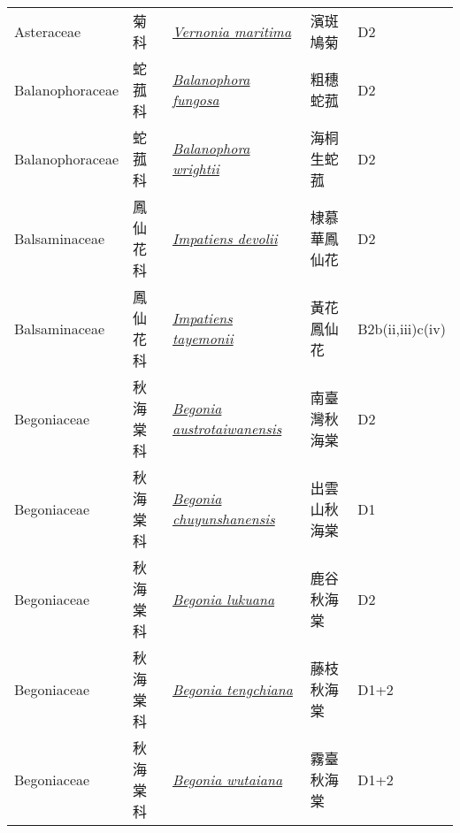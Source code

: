 {\begin{longtable}{p{2.5cm}p{2.5cm}p{4.5cm}p{2.5cm}p{3cm}}
    Asteraceae & 菊科 & \href{http://www.theplantlist.org/tpl1.1/search?q=Vernonia+maritima}{\textit{Vernonia maritima} } & 濱斑鳩菊 & D2 \index{Vernonia@\textit{Vernonia}!maritima@\textit{maritima}}  \index{濱斑鳩菊} \\
    Balanophoraceae & 蛇菰科 & \href{http://www.theplantlist.org/tpl1.1/search?q=Balanophora+fungosa}{\textit{Balanophora fungosa} } & 粗穗蛇菰 & D2 \index{Balanophora@\textit{Balanophora}!fungosa@\textit{fungosa}}  \index{粗穗蛇菰} \\
    Balanophoraceae & 蛇菰科 & \href{http://www.theplantlist.org/tpl1.1/search?q=Balanophora+wrightii}{\textit{Balanophora wrightii} } & 海桐生蛇菰 & D2 \index{Balanophora@\textit{Balanophora}!wrightii@\textit{wrightii}}  \index{海桐生蛇菰} \\
    Balsaminaceae & 鳳仙花科 & \href{http://www.theplantlist.org/tpl1.1/search?q=Impatiens+devolii}{\textit{Impatiens devolii} } & 棣慕華鳳仙花 & D2 \index{Impatiens@\textit{Impatiens}!devolii@\textit{devolii}}  \index{棣慕華鳳仙花} \\
    Balsaminaceae & 鳳仙花科 & \href{http://www.theplantlist.org/tpl1.1/search?q=Impatiens+tayemonii}{\textit{Impatiens tayemonii} } & 黃花鳳仙花 & B2b(ii,iii)c(iv) \index{Impatiens@\textit{Impatiens}!tayemonii@\textit{tayemonii}}  \index{黃花鳳仙花} \\
    Begoniaceae & 秋海棠科 & \href{http://www.theplantlist.org/tpl1.1/search?q=Begonia+austrotaiwanensis}{\textit{Begonia austrotaiwanensis} } & 南臺灣秋海棠 & D2 \index{Begonia@\textit{Begonia}!austrotaiwanensis@\textit{austrotaiwanensis}}  \index{南臺灣秋海棠} \\
    Begoniaceae & 秋海棠科 & \href{http://www.theplantlist.org/tpl1.1/search?q=Begonia+chuyunshanensis}{\textit{Begonia chuyunshanensis} } & 出雲山秋海棠 & D1 \index{Begonia@\textit{Begonia}!chuyunshanensis@\textit{chuyunshanensis}}  \index{出雲山秋海棠} \\
    Begoniaceae & 秋海棠科 & \href{http://www.theplantlist.org/tpl1.1/search?q=Begonia+lukuana}{\textit{Begonia lukuana} } & 鹿谷秋海棠 & D2 \index{Begonia@\textit{Begonia}!lukuana@\textit{lukuana}}  \index{鹿谷秋海棠} \\
    Begoniaceae & 秋海棠科 & \href{http://www.theplantlist.org/tpl1.1/search?q=Begonia+tengchiana}{\textit{Begonia tengchiana} } & 藤枝秋海棠 & D1+2 \index{Begonia@\textit{Begonia}!tengchiana@\textit{tengchiana}}  \index{藤枝秋海棠} \\
    Begoniaceae & 秋海棠科 & \href{http://www.theplantlist.org/tpl1.1/search?q=Begonia+wutaiana}{\textit{Begonia wutaiana} } & 霧臺秋海棠 & D1+2 \index{Begonia@\textit{Begonia}!wutaiana@\textit{wutaiana}}  \index{霧臺秋海棠} \\

\end{longtable}}

